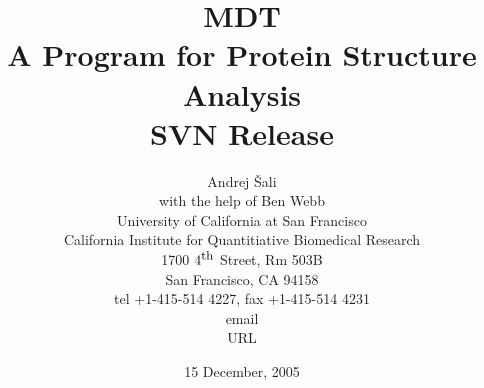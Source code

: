\title{MDT \\
       A Program for Protein Structure Analysis \\
       SVN Release}

\author{Andrej \v{S}ali \\[0.5cm]
with the help of Ben Webb \\ [0.5cm]
University of California at San Francisco \\
California Institute for Quantitiative Biomedical Research \\
1700 $4^{\mbox{\small th}}$ Street, Rm 503B \\
San Francisco, CA 94158\\
tel +1-415-514 4227, fax +1-415-514 4231 \\
email  \\
URL 
}

\date{15 December, 2005}
